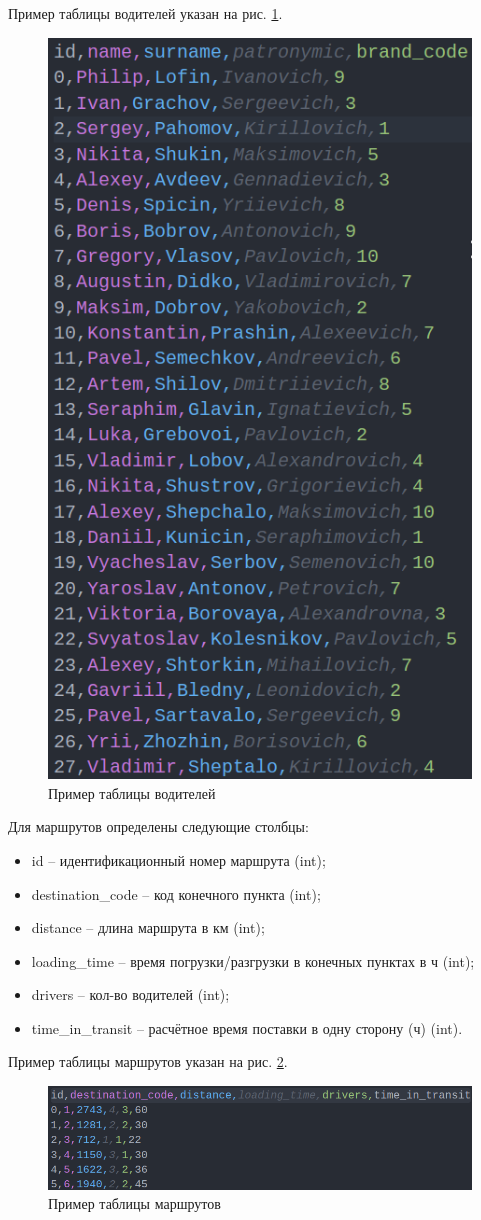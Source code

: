 Пример таблицы водителей указан на рис. \ref{driver_table}.

\begin{figure}[hpt!]
	\centering
	\includegraphics[width=0.5\linewidth]{photo/driver_table}
	\caption{Пример таблицы водителей}
	\label{driver_table}
\end{figure}

\newpage

Для маршрутов определены следующие столбцы:
\begin{itemize}
	\item id -- идентификационный номер маршрута (int);
	\item destination\_code -- код конечного пункта (int);
	\item distance -- длина маршрута в км (int);
	\item loading\_time -- время погрузки/разгрузки в конечных пунктах в ч (int);
	\item drivers -- кол-во водителей (int);
	\item time\_in\_transit -- расчётное время поставки в одну сторону (ч) (int).
\end{itemize}

Пример таблицы маршрутов указан на рис. \ref{route_table}.

\begin{figure}[hpt!]
	\centering
	\includegraphics[width=0.8\linewidth]{photo/route_table}
	\caption{Пример таблицы маршрутов}
	\label{route_table}
\end{figure}

